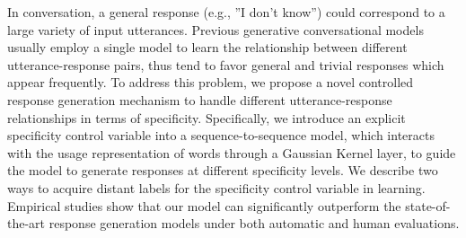 In conversation, a general response (e.g., ''I don't know'') could correspond to a large variety of input utterances. Previous generative conversational models usually employ a single model to learn the relationship between different utterance-response pairs, thus tend to favor general and trivial responses which appear frequently. To address this problem, we propose a novel controlled response generation mechanism to handle different utterance-response relationships in terms of specificity. Specifically, we introduce an explicit specificity control variable into a sequence-to-sequence model, which interacts with the usage representation of words through a Gaussian Kernel layer, to guide the model to generate responses at different specificity levels. We describe two ways to acquire distant labels for the specificity control variable in learning. Empirical studies show that our model can significantly outperform the state-of-the-art response generation models under both automatic and human evaluations.
